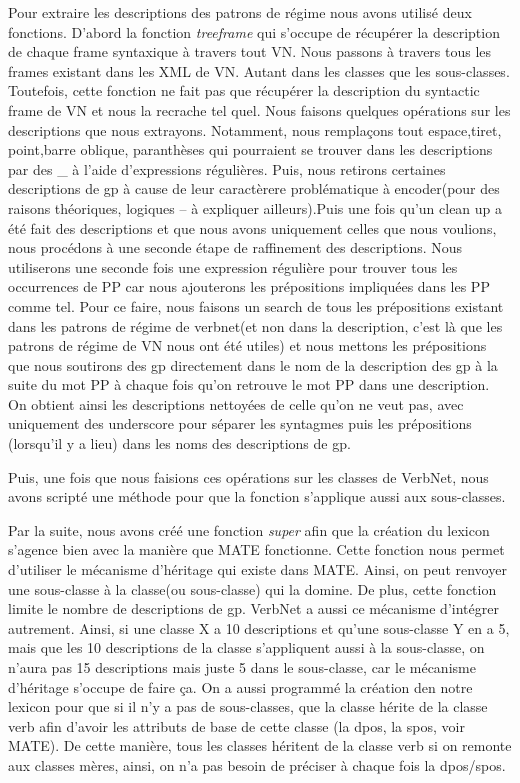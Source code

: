 Pour extraire les descriptions des patrons de régime nous avons utilisé deux fonctions. D'abord la fonction \emph{treeframe} qui s'occupe de récupérer la description de chaque frame syntaxique à travers tout VN. Nous passons à travers tous les frames existant dans les XML de VN. Autant dans les classes que les sous-classes. Toutefois, cette fonction ne fait pas que récupérer la description du syntactic frame de VN et nous la recrache tel quel. Nous faisons quelques opérations sur les descriptions que nous extrayons. Notamment, nous remplaçons tout espace,tiret, point,barre oblique, paranthèses qui pourraient se trouver dans les descriptions par des {\_} à l'aide d'expressions régulières. Puis, nous retirons certaines descriptions de gp à cause de leur caractèrere problématique à encoder(pour des raisons théoriques, logiques -- à expliquer ailleurs).Puis une fois qu'un clean up a été fait des descriptions et que nous avons uniquement celles que nous voulions, nous procédons à une seconde étape de raffinement des descriptions. Nous utiliserons une seconde fois une expression régulière pour trouver tous les occurrences de PP car nous ajouterons les prépositions impliquées dans les PP comme tel. Pour ce faire, nous faisons un search de tous les prépositions existant dans les patrons de régime de verbnet(et non dans la description, c'est là que les patrons de régime de VN nous ont été utiles) et nous mettons les prépositions que nous soutirons des gp directement dans le nom de la description des gp à la suite du mot PP à chaque fois qu'on retrouve le mot PP dans une description. On obtient ainsi les descriptions nettoyées de celle qu'on ne veut pas, avec uniquement des underscore pour séparer les syntagmes puis les prépositions (lorsqu'il y a lieu) dans les noms des descriptions de gp.

Puis, une fois que nous faisions ces opérations sur les classes de VerbNet, nous avons scripté une méthode pour que la fonction s'applique aussi aux sous-classes.

Par la suite, nous avons créé une fonction \emph{super} afin que la création du lexicon s'agence bien avec la manière que MATE fonctionne. Cette fonction nous permet d'utiliser le mécanisme d'héritage qui existe dans MATE. Ainsi, on peut renvoyer une sous-classe à la classe(ou sous-classe) qui la domine. De plus, cette fonction limite le nombre de descriptions de gp. VerbNet a aussi ce mécanisme d'intégrer autrement. Ainsi, si une classe X a 10 descriptions et qu'une sous-classe Y en a 5, mais que les 10 descriptions de la classe s'appliquent aussi à la sous-classe, on n'aura pas 15 descriptions mais juste 5 dans le sous-classe, car le mécanisme d'héritage s'occupe de faire ça. On a aussi programmé la création den notre lexicon pour que si il n'y a pas de sous-classes, que la classe hérite de la classe verb afin d'avoir les attributs de base de cette classe (la dpos, la spos, voir MATE). De cette manière, tous les classes héritent de la classe verb si on remonte aux classes mères, ainsi, on n'a pas besoin de préciser à chaque fois la dpos/spos.

